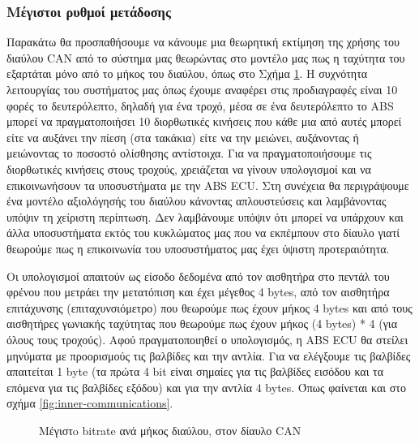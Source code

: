 \documentclass{article}
\begin{document}
\subsubsection{Μέγιστοι ρυθμοί μετάδοσης}
Παρακάτω θα προσπαθήσουμε να κάνουμε μια θεωρητική εκτίμηση της χρήσης του διαύλου CAN από το σύστημα μας θεωρώντας στο μοντέλο μας πως η ταχύτητα του εξαρτάται μόνο από το μήκος του διαύλου, όπως στο Σχήμα \ref{fig:can-latencies}. Η συχνότητα λειτουργίας του συστήματος μας όπως έχουμε αναφέρει στις προδιαγραφές είναι 10 φορές το δευτερόλεπτο, δηλαδή για ένα τροχό, μέσα σε ένα δευτερόλεπτο το ABS μπορεί να πραγματοποιήσει 10 διορθωτικές κινήσεις που κάθε μια από αυτές μπορεί είτε να αυξάνει την πίεση (στα τακάκια) είτε να την μειώνει, αυξάνοντας ή μειώνοντας το ποσοστό ολίσθησης αντίστοιχα. Για να πραγματοποιήσουμε τις διορθωτικές κινήσεις στους τροχούς, χρειάζεται να γίνουν υπολογισμοί και να επικοινωνήσουν τα υποσυστήματα με την ABS ECU. Στη συνέχεια θα περιγράψουμε ένα μοντέλο αξιολόγησής του διαύλου κάνοντας απλουστεύσεις και λαμβάνοντας υπόψιν τη χείριστη περίπτωση. Δεν λαμβάνουμε υπόψιν ότι μπορεί να υπάρχουν και άλλα υποσυστήματα εκτός του κυκλώματος μας που να εκπέμπουν στο δίαυλο γιατί θεωρούμε πως η επικοινωνία του υποσυστήματος μας έχει ύψιστη προτεραιότητα.
\par
Οι υπολογισμοί απαιτούν ως είσοδο δεδομένα από τον αισθητήρα στο πεντάλ του φρένου που μετράει την μετατόπιση και έχει μέγεθος 4 bytes, από τον αισθητήρα επιτάχυνσης (επιταχυνσιόμετρο) που θεωρούμε πως έχουν μήκος 4 bytes και από τους αισθητήρες γωνιακής ταχύτητας που θεωρούμε πως έχουν μήκος (4 bytes) * 4 (για όλους τους τροχούς). Αφού πραγματοποιηθεί ο υπολογισμός, η ABS ECU θα στείλει μηνύματα με προορισμούς τις βαλβίδες και την αντλία. Για να ελέγξουμε τις βαλβίδες απαιτείται 1 byte (τα πρώτα 4 bit είναι σημαίες για τις βαλβίδες εισόδου και τα επόμενα για τις βαλβίδες εξόδου) και για την αντλία 4 bytes. Όπως φαίνεται και στο σχήμα \ref{fig:inner-communications}.

\begin{figure}[H]
\caption{Μέγιστo bitrate ανά μήκος διαύλου, στον δίαυλο CAN \cite{canreq:20}}
\label{fig:can-latencies}
\end{figure}
\end{document}
